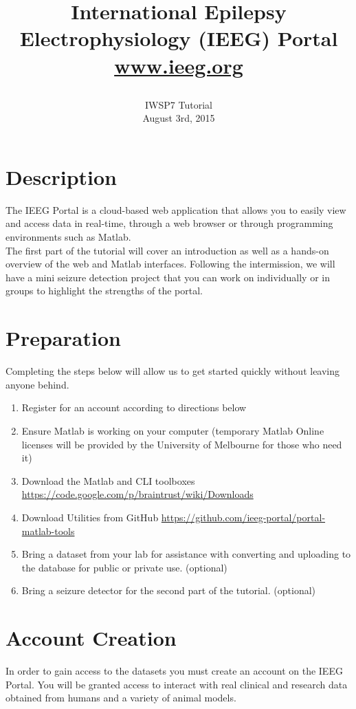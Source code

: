 \documentclass[10pt]{article}
\begin{document}
\title{International Epilepsy Electrophysiology (IEEG) Portal \\
\url{www.ieeg.org} \\
	\author { \large IWSP7 Tutorial \\
	August 3rd, 2015} }
\date{}
\maketitle

\section*{Description}
The IEEG Portal is a cloud-based web application that allows you to easily view and access data in real-time, through a web browser or through programming environments such as Matlab. \\
The first part of the tutorial will cover an introduction as well as a hands-on overview of the web and Matlab interfaces. Following the intermission, we will have a mini seizure detection project that you can work on individually or in groups to highlight the strengths of the portal.

\section*{Preparation}
Completing the steps below will allow us to get started quickly without leaving anyone behind.
\begin{enumerate}
\item Register for an account according to directions below
\item Ensure Matlab is working on your computer (temporary Matlab Online licenses will be provided by the University of Melbourne for those who need it)
\item Download the Matlab and CLI toolboxes \url{https://code.google.com/p/braintrust/wiki/Downloads}
\item Download Utilities from GitHub \url{https://github.com/ieeg-portal/portal-matlab-tools}
\item Bring a dataset from your lab for assistance with converting and uploading to the database for public or private use.  (optional)
\item Bring a seizure detector for the second part of the tutorial.  (optional) 
\end{enumerate}

\section*{Account Creation}
In order to gain access to the datasets you must create an account on the IEEG Portal. You will be granted access to interact with real clinical and research data obtained from humans and a variety of animal models.
\end{document}
